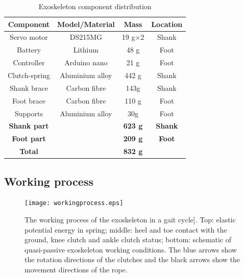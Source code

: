 \documentclass[twocolumn,cleanfoot,10pt]{asme2ej}
\begin{document}
\begin{table}[t]
	\caption{Exoskeleton component distribution}
	\begin{center}
		\label{tab:hardware}
		\begin{tabular}{c c c c}	
			\hline
			\textbf{Component} & \textbf{Model/Material} & \textbf{Mass} & \textbf{Location} \\
			\hline
			Servo motor & DS215MG & 19 g$\times$2 & Shank\\
			Battery & Lithium & 48 g & Foot\\
			Controller & Arduino nano & 21 g & Foot\\
			Clutch-spring & Aluminium alloy & 442 g & Shank\\
			Shank brace & Carbon fibre & 143g & Shank\\
			Foot brace & Carbon fibre & 110 g & Foot\\
			Supports & Aluminium alloy & 30g & Foot\\			
			\hline 
			\textbf{Shank part} & & \textbf{623 g} & \textbf{Shank}\\
			\textbf{Foot part} & & \textbf{209 g} & \textbf{Foot}\\
			\hline
			\textbf{Total} & & \textbf{832 g} & \\
			\hline
			
		\end{tabular}
	\end{center}
\end{table}



\subsection{Working process}
\label{subsec:Working process}

\begin{figure}[tb]
	\centering
	\texttt{[image: workingprocess.eps]}
	\caption{The working process of the exoskeleton in a gait cycle]. Top: elastic potential energy in spring; middle: heel and toe contact with the ground, knee clutch and ankle clutch status; bottom: schematic of quasi-passive exoskeleton working conditions. The blue arrows show the rotation directions of the clutches and the black arrows show the movement directions of the rope.}
	\label{fig:workprocess}   
\end{figure}
\end{document}
